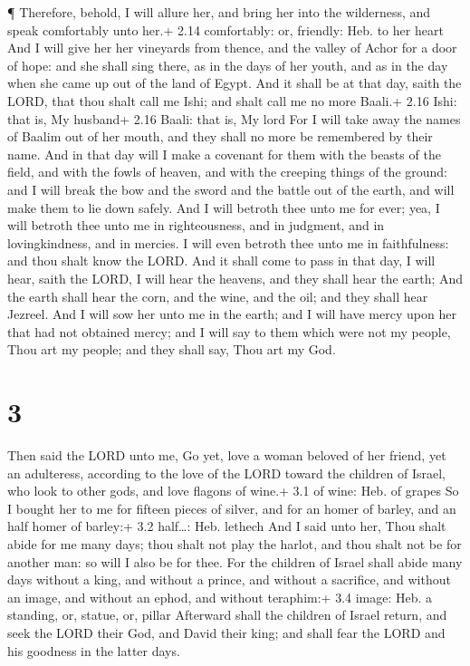  ¶ Therefore, behold, I will allure her, and bring her into
the wilderness, and speak comfortably unto her.+ 2.14 comfortably: or,
friendly: Heb. to her heart  And I will give her her
vineyards from thence, and the valley of Achor for a door of hope: and
she shall sing there, as in the days of her youth, and as in the day
when she came up out of the land of Egypt.  And it shall be
at that day, saith the LORD, that thou shalt call me Ishi; and shalt
call me no more Baali.+ 2.16 Ishi: that is, My husband+ 2.16 Baali: that
is, My lord  For I will take away the names of Baalim out
of her mouth, and they shall no more be remembered by their name.
 And in that day will I make a covenant for them with the
beasts of the field, and with the fowls of heaven, and with the creeping
things of the ground: and I will break the bow and the sword and the
battle out of the earth, and will make them to lie down safely.
 And I will betroth thee unto me for ever; yea, I will
betroth thee unto me in righteousness, and in judgment, and in
lovingkindness, and in mercies.  I will even betroth thee
unto me in faithfulness: and thou shalt know the LORD.  And
it shall come to pass in that day, I will hear, saith the LORD, I will
hear the heavens, and they shall hear the earth;  And the
earth shall hear the corn, and the wine, and the oil; and they shall
hear Jezreel.  And I will sow her unto me in the earth; and
I will have mercy upon her that had not obtained mercy; and I will say
to them which were not my people, Thou art my people; and they shall
say, Thou art my God.

\hypertarget{section-2}{%
\section{3}\label{section-2}}

 Then said the LORD unto me, Go yet, love a woman beloved of
her friend, yet an adulteress, according to the love of the LORD toward
the children of Israel, who look to other gods, and love flagons of
wine.+ 3.1 of wine: Heb. of grapes  So I bought her to me
for fifteen pieces of silver, and for an homer of barley, and an half
homer of barley:+ 3.2 half\ldots: Heb. lethech  And I said
unto her, Thou shalt abide for me many days; thou shalt not play the
harlot, and thou shalt not be for another man: so will I also be for
thee.  For the children of Israel shall abide many days
without a king, and without a prince, and without a sacrifice, and
without an image, and without an ephod, and without teraphim:+ 3.4
image: Heb. a standing, or, statue, or, pillar  Afterward
shall the children of Israel return, and seek the LORD their God, and
David their king; and shall fear the LORD and his goodness in the latter
days.


